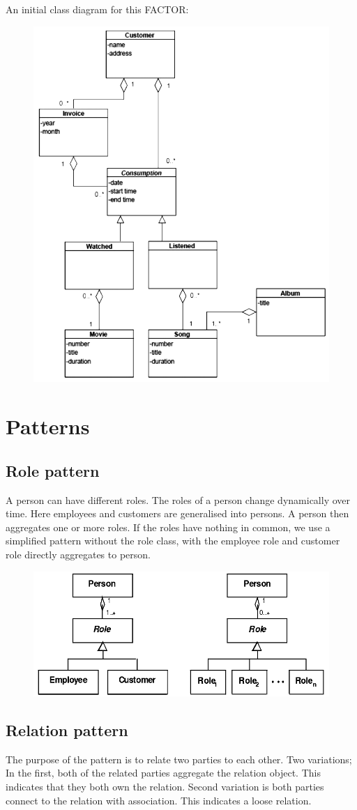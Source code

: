An initial class diagram for this FACTOR:
\begin{figure}[H]
    \centering
    \includegraphics[width=.5\textwidth]{figures/prelimstreamclassdiagram.png}
\end{figure}

\section{Patterns}
\subsection{Role pattern}
A person can have different roles. The roles of a person change dynamically over time. Here employees and customers are generalised into persons. A person then aggregates one or more roles. If the roles have nothing in common, we use a simplified pattern without the role class, with the employee role and customer role directly aggregates to person.

\begin{figure}[H]
    \centering
    \includegraphics[width=.5\textwidth]{figures/rolepattern.png}
\end{figure}

\subsection{Relation pattern}
The purpose of the pattern is to relate two parties to each other. Two variations; In the first, both of the related parties aggregate the relation object. This indicates that they both own the relation. Second variation is both parties connect to the relation with association. This indicates a loose relation.

